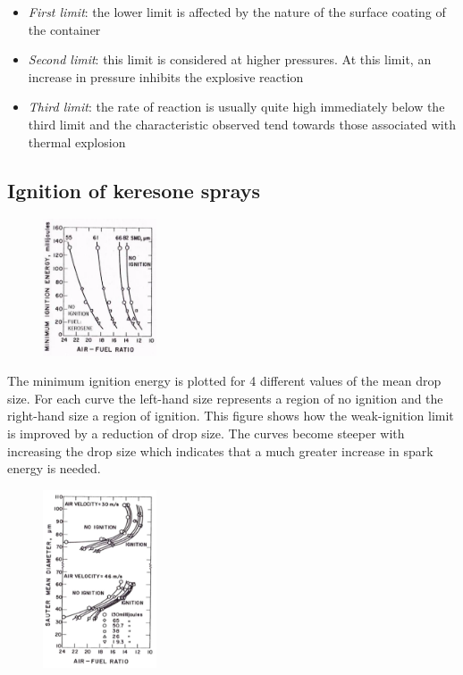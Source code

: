 \documentclass[12pt]{article}
\begin{document}
\begin{itemize}
    \item \textit{First limit}: the lower limit is affected by the nature of the surface coating of the container
    \item \textit{Second limit}: this limit is considered at higher pressures. At this limit, an increase in pressure inhibits the explosive reaction
    \item \textit{Third limit}: the rate of reaction is usually quite high immediately below the third limit and the characteristic observed tend towards those associated with thermal explosion
\end{itemize}

\subsection{Ignition of keresone sprays}

\begin{figure}[!ht]
\centering
\includegraphics[width=0.3\textwidth]{figures/kerosene.png}
\end{figure}

The minimum ignition energy is plotted for 4 different values of the mean drop size. For each curve the left-hand size represents a region of no ignition and the right-hand size a region of ignition. This figure shows how the weak-ignition limit is improved by a reduction of drop size. The curves become steeper with increasing the drop size which indicates that a much greater increase in spark energy is needed.

\begin{figure}[!ht]
\centering
\includegraphics[width=0.3\textwidth]{figures/kerosene2.png}
\end{figure}
\end{document}
